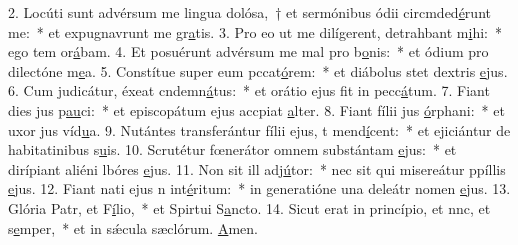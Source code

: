 2. Locúti sunt advérsum me lingua dolósa,~† et sermónibus ódii circmded\uline{é}runt me:~* et expugnavrunt me gr\uline{a}tis.
3. Pro eo ut me dilígerent, detrahbant m\uline{i}hi:~* ego tem or\uline{á}bam.
4. Et posuérunt advérsum me mal pro b\uline{o}nis:~* et ódium pro dilectóne m\uline{e}a.
5. Constítue super eum pccat\uline{ó}rem:~* et diábolus stet  dextris \uline{e}jus.
6. Cum judicátur, éxeat cndemn\uline{á}tus:~* et orátio ejus fit in pecc\uline{á}tum.
7. Fiant dies jus p\uline{au}ci:~* et episcopátum ejus accpiat \uline{a}lter.
8. Fiant fílii jus \uline{ó}rphani:~* et uxor jus víd\uline{u}a.
9. Nutántes transferántur fílii ejus, t mend\uline{í}cent:~* et ejiciántur de habitatinibus s\uline{u}is.
10. Scrutétur fœnerátor omnem substántam \uline{e}jus:~* et dirípiant aliéni lbóres \uline{e}jus.
11. Non sit ill adj\uline{ú}tor:~* nec sit qui misereátur ppíllis \uline{e}jus.
12. Fiant nati ejus n int\uline{é}ritum:~* in generatióne una deleátr nomen \uline{e}jus.
13. Glória Patr, et F\uline{í}lio,~* et Spirtui S\uline{a}ncto.
14. Sicut erat in princípio, et nnc, et s\uline{e}mper,~* et in sǽcula sæclórum. \uline{A}men.
